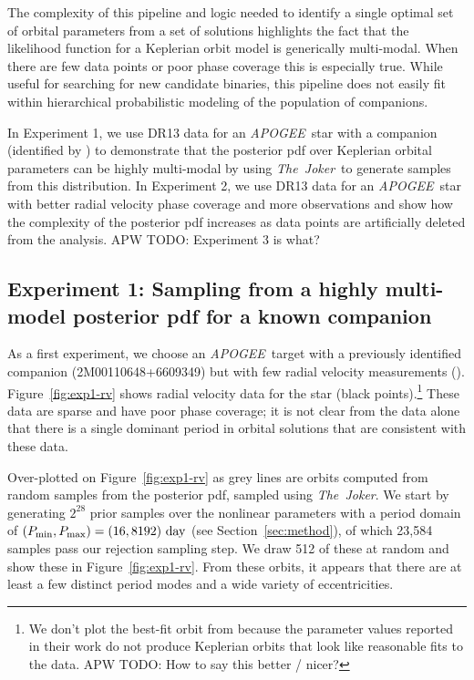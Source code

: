 \documentclass[manuscript, letterpaper]{aastex6}
\newcommand{\project}[1]{\textsl{#1}}
\newcommand{\acronym}[1]{{\small{#1}}}
\newcommand{\apogee}{\project{\acronym{APOGEE}}}
\newcommand{\samplername}{\project{The~Joker}}
\newcommand{\todoapw}[1]{{\color{red}APW TODO: #1}}
\begin{document}
The complexity of this pipeline and logic needed to identify a single optimal
set of orbital parameters from a set of solutions highlights the fact that the
likelihood function for a Keplerian orbit model is generically multi-modal.
When there are few data points or poor phase coverage this is especially true.
While useful for searching for new candidate binaries, this pipeline does not
easily fit within hierarchical probabilistic modeling of the population of
companions.

In Experiment 1, we use DR13 data for an \apogee\ star with a companion
(identified by \citealt{Troup:2016}) to demonstrate that the posterior pdf over
Keplerian orbital parameters can be highly multi-modal by using \samplername\
to generate samples from this distribution.
In Experiment 2, we use DR13 data for an \apogee\ star with better radial
velocity phase coverage and more observations and show how the complexity of
the posterior pdf increases as data points are artificially deleted from the
analysis.
\todoapw{Experiment 3 is what?}

\subsection{Experiment 1: Sampling from a highly multi-model posterior pdf for
a known companion}

As a first experiment, we choose an \apogee\ target with a previously
identified companion (2M00110648+6609349) but with few radial velocity
measurements (\citealt{Troup:2016}).
Figure~\ref{fig:exp1-rv} shows radial velocity data for the star (black
points).\footnote{We don't plot the best-fit orbit from \citealt{Troup:2016}
because the parameter values reported in their work do not produce Keplerian
orbits that look like reasonable fits to the data.
\todoapw{How to say this better / nicer?}}
These data are sparse and have poor phase coverage; it is not clear from the
data alone that there is a single dominant period in orbital solutions that are
consistent with these data.

Over-plotted on Figure~\ref{fig:exp1-rv} as grey lines are orbits computed from
random samples from the posterior pdf, sampled using \samplername.
We start by generating $2^{28}$ prior samples over the nonlinear parameters with
a period domain of $(P_{\rm min}, P_{\rm max}) = (16, 8192)~{\rm day}$ (see
Section~\ref{sec:method}), of which 23,584 samples pass our rejection sampling
step.
We draw 512 of these at random and show these in Figure~\ref{fig:exp1-rv}.
From these orbits, it appears that there are at least a few distinct period
modes and a wide variety of eccentricities.
\end{document}
